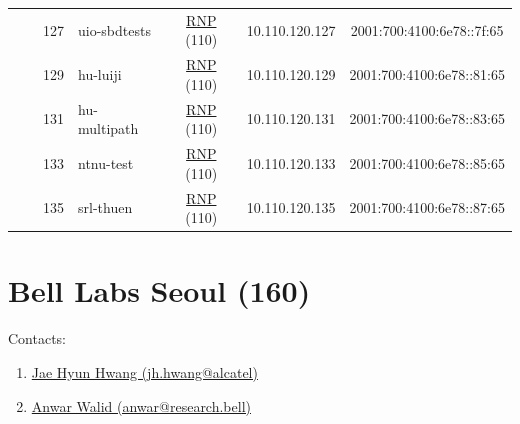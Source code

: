 \begin{small}
\begin{center}
\begin{longtable}{|c|c|c|c|c|c|c|c|}
  &  & \tiny{127} & \multicolumn{1}{|l|}{\tiny{uio-sbdtests}} & \multicolumn{2}{|c|}{\tiny{\href{https://www.rnp.br}{RNP} (110)}} & \tiny{10.110.120.127} & \tiny{2001:700:4100:6e78::7f:65} \\* \cline{3-3}\cline{4-4}\cline{5-5}\cline{6-6}\cline{7-7}\cline{8-8}
  &  & \tiny{129} & \multicolumn{1}{|l|}{\tiny{hu-luiji}} & \multicolumn{2}{|c|}{\tiny{\href{https://www.rnp.br}{RNP} (110)}} & \tiny{10.110.120.129} & \tiny{2001:700:4100:6e78::81:65} \\* \cline{3-3}\cline{4-4}\cline{5-5}\cline{6-6}\cline{7-7}\cline{8-8}
  &  & \tiny{131} & \multicolumn{1}{|l|}{\tiny{hu-multipath}} & \multicolumn{2}{|c|}{\tiny{\href{https://www.rnp.br}{RNP} (110)}} & \tiny{10.110.120.131} & \tiny{2001:700:4100:6e78::83:65} \\* \cline{3-3}\cline{4-4}\cline{5-5}\cline{6-6}\cline{7-7}\cline{8-8}
  &  & \tiny{133} & \multicolumn{1}{|l|}{\tiny{ntnu-test}} & \multicolumn{2}{|c|}{\tiny{\href{https://www.rnp.br}{RNP} (110)}} & \tiny{10.110.120.133} & \tiny{2001:700:4100:6e78::85:65} \\* \cline{3-3}\cline{4-4}\cline{5-5}\cline{6-6}\cline{7-7}\cline{8-8}
  &  & \tiny{135} & \multicolumn{1}{|l|}{\tiny{srl-thuen}} & \multicolumn{2}{|c|}{\tiny{\href{https://www.rnp.br}{RNP} (110)}} & \tiny{10.110.120.135} & \tiny{2001:700:4100:6e78::87:65} \\ \hline
\end{longtable}
\end{center}
\end{small}



\section{Bell Labs Seoul (160)}
\label{sec:BLS}

Contacts:
\begin{enumerate}
 \item {}\href{mailto:jh.hwang@alcatel}{Jae Hyun Hwang (jh.hwang@alcatel)}
 \item {}\href{mailto:anwar@research.bell}{Anwar Walid (anwar@research.bell)}
\end{enumerate}

